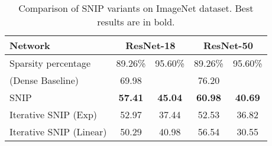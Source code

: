 \begin{table}[t!]
    \begin{center}
    {
    \caption{
    Comparison of SNIP variants on ImageNet dataset. Best results are in bold.  }
    \label{tab:snip-variants-imagenet}
    \begin{tabular}{ l cccc}
    \\
    \hline
    \toprule
    Network & \multicolumn{2}{c}{\textbf{ResNet-18}} &\multicolumn{2}{c}{\textbf{ResNet-50}} \\
    \midrule
    Sparsity percentage & 89.26\% & 95.60\% & 89.26\% & 95.60\% \\ 
    \midrule
    (Dense Baseline) &69.98&&76.20& \\
    \midrule
    SNIP \cite{snip} &\textbf{57.41} &\textbf{45.04}& \textbf{60.98} & \textbf{40.69} \\
    Iterative SNIP (Exp) \cite{force} &52.97 &37.44& 52.53 & 36.82 \\
    Iterative SNIP (Linear) &50.29 &40.98& 56.54 & 30.55 \\
    \bottomrule
    \end{tabular}
    }    


    \end{center}
\end{table}